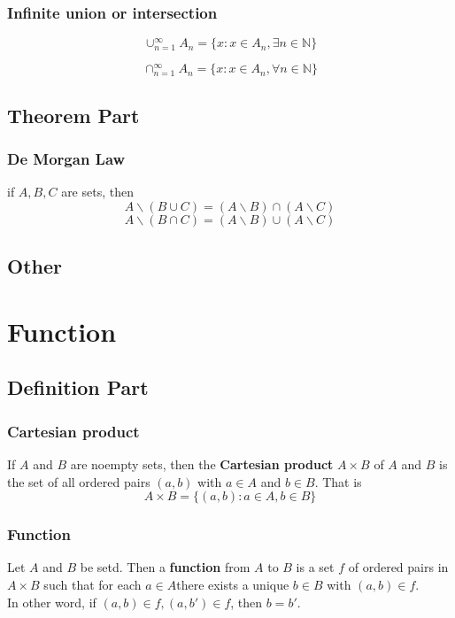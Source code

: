 \documentclass{article}
\begin{document}
            \subsubsection{Infinite union or intersection}
                $$\cup _{n=1} ^{\infty} A_n=\{x:x\in A_n ,\exists n \in \mathbb{N} \}$$

                $$\cap _{n=1} ^{\infty} A_n=\{x:x\in A_n ,\forall n \in \mathbb{N} \}$$
        \subsection{Theorem Part}
            \subsubsection{De Morgan Law}
            if $A,B,C$ are sets, then
            $$A \backslash (B\cup C) = (A\backslash B)\cap (A\backslash C)$$
            $$A\backslash (B\cap C) = (A\backslash B)\cup (A\backslash C)$$

        \subsection{Other}

    \section{Function}
        \subsection{Definition Part}
            \subsubsection{Cartesian product}
                If $A$ and $B$ are noempty sets, then the \textbf{Cartesian product} $A \times B$ of $A$ and $B$ is the set of all ordered pairs $(a,b)$ with $a\in A$ and $b\in B$. That is 
                $$A\times B = \{(a,b):a\in A,b\in B\}$$

            \subsubsection{Function}
                Let $A$ and $B$ be setd. Then a \textbf{function} from $A$ to $B$ is a set $f$ of ordered pairs in $A\times B$ such that for each $a\in A$there exists a unique $b\in B$ with $(a,b)\in f$.
                \\
                In other word, if $(a,b)\in f,(a,b')\in f$, then $b=b'$.
\end{document}
